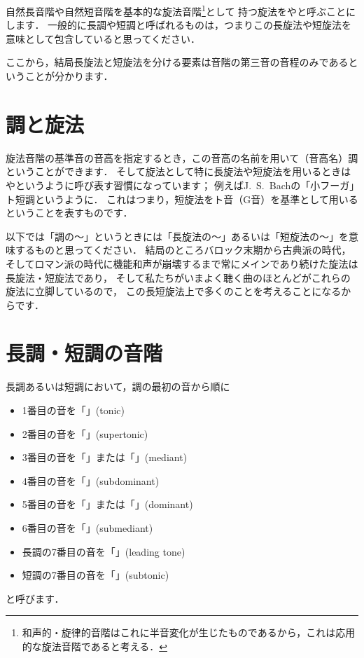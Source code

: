 \documentclass[dvipdfmx,uplatex,b5paper,openany,jbase=12Q,nomag*,textwidth-limit=44%
               ]{gachimuchi}
\begin{document}
自然長音階や自然短音階を基本的な旋法音階\footnote{%
  和声的・旋律的音階はこれに半音変化が生じたものであるから，これは応用的な旋法音階であると考える．
}として
持つ旋法をやと呼ぶことにします．
一般的に長調や短調と呼ばれるものは，つまりこの長旋法や短旋法を意味として包含していると思ってください．
\begin{Yodan}
  ここから，結局長旋法と短旋法を分ける要素は音階の第三音の音程のみであるということが分かります．
\end{Yodan}

\section{調と旋法}
旋法音階の基準音の音高を指定するとき，この音高の名前を用いて（音高名）調ということができます．
そして旋法として特に長旋法や短旋法を用いるときはやというように呼び表す習慣になっています；
例えばJ.~S.~Bachの「小フーガ」ト短調というように．
これはつまり，短旋法をト音（G音）を基準として用いるということを表すものです．

以下では「調の～」というときには「長旋法の～」あるいは「短旋法の～」を意味するものと思ってください．
結局のところバロック末期から古典派の時代，
そしてロマン派の時代に機能和声が崩壊するまで常にメインであり続けた旋法は長旋法・短旋法であり，
そして私たちがいまよく聴く曲のほとんどがこれらの旋法に立脚しているので，
この長短旋法上で多くのことを考えることになるからです．


\section{長調・短調の音階}
長調あるいは短調において，調の最初の音から順に
\begin{itemize}
  \item 1番目の音を「」(tonic)
  \item 2番目の音を「」(supertonic)
  \item 3番目の音を「」または「」(mediant)
  \item 4番目の音を「」(subdominant)
  \item 5番目の音を「」または「」(dominant)
  \item 6番目の音を「」(submediant)
  \item 長調の7番目の音を「」(leading tone)
  \item 短調の7番目の音を「」(subtonic)
\end{itemize}
と呼びます．
\end{document}
